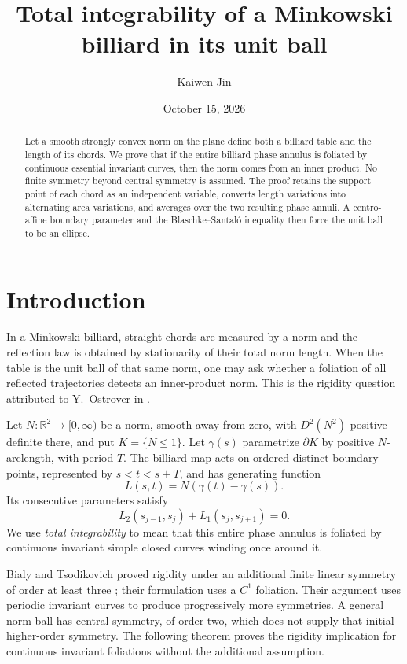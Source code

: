 \documentclass[11pt]{amsart}
\title{Total integrability of a Minkowski billiard in its unit ball}
\author{Kaiwen Jin}
\date{October 15, 2026}
\theoremstyle{remark}
\newcommand{\R}{\mathbb R}
\begin{document}
\begin{abstract}
Let a smooth strongly convex norm on the plane define both a billiard
table and the length of its chords. We prove that if the entire billiard
phase annulus is foliated by continuous essential invariant curves, then
the norm comes from an inner product. No finite symmetry beyond central
symmetry is assumed. The proof retains the support point of each chord
as an independent variable, converts length variations into alternating
area variations, and averages over the two resulting phase annuli.
A centro-affine boundary parameter and the Blaschke--Santal\'o inequality
then force the unit ball to be an ellipse.
\end{abstract}
\maketitle

\section{Introduction}\label{sec:intro}
In a Minkowski billiard, straight chords are measured by a norm and the
reflection law is obtained by stationarity of their total norm length.
When the table is the unit ball of that same norm, one may ask whether
a foliation of all reflected trajectories detects an inner-product norm.
This is the rigidity question attributed to
Y.~Ostrover in \cite[Section 9.5, Question 1]{BM}.

Let $N:\R^2\to[0,\infty)$ be a norm, smooth away from zero, with
$D^2(N^2)$ positive definite there, and put $K=\{N\leq1\}$.
Let $\gamma(s)$ parametrize $\partial K$ by positive $N$-arclength,
with period $T$. The billiard map acts on ordered distinct boundary
points, represented by $s<t<s+T$, and has generating function
\[
L(s,t)=N(\gamma(t)-\gamma(s)).
\]
Its consecutive parameters satisfy
\[
L_2(s_{j-1},s_j)+L_1(s_j,s_{j+1})=0.
\]
We use \emph{total integrability} to mean that this entire phase annulus
is foliated by continuous invariant simple closed curves winding once
around it.

Bialy and Tsodikovich proved rigidity under an additional finite linear
symmetry of order at least three
\cite[Theorem 5]{BT}; their formulation uses a $C^1$ foliation.
Their argument uses periodic invariant curves to produce progressively
more symmetries. A general norm ball has central symmetry, of order two,
which does not supply that initial higher-order symmetry.
The following theorem proves the rigidity implication for continuous
invariant foliations without the additional assumption.
\end{document}
